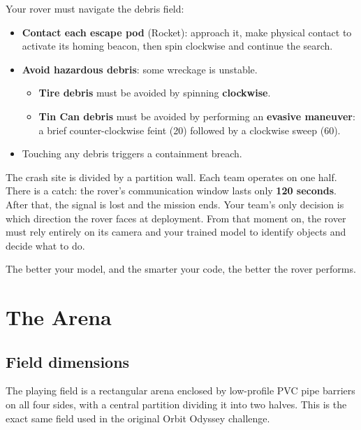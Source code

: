 \documentclass[a4]{article}
\begin{document}
Your rover must navigate the debris field:
\begin{itemize}
    \item \textbf{Contact each escape pod} (Rocket): approach it, make physical contact to activate its homing beacon, then spin clockwise and continue the search.
    \item \textbf{Avoid hazardous debris}: some wreckage is unstable.
    \begin{itemize}
        \item \textbf{Tire debris} must be avoided by spinning \textbf{clockwise}.
        \item \textbf{Tin Can debris} must be avoided by performing an \textbf{evasive maneuver}: a brief counter-clockwise feint (20\textdegree) followed by a clockwise sweep (60\textdegree).
    \end{itemize}
    \item Touching any debris triggers a containment breach.
\end{itemize}

The crash site is divided by a partition wall. Each team operates on one half. There is a catch: the rover's communication window lasts only \textbf{120 seconds}. After that, the signal is lost and the mission ends. Your team's only decision is which direction the rover faces at deployment. From that moment on, the rover must rely entirely on its camera and your trained model to identify objects and decide what to do.

The better your model, and the smarter your code, the better the rover performs.

\pagebreak
\section{The Arena}
\subsection*{Field dimensions}

The playing field is a rectangular arena enclosed by low-profile PVC pipe barriers on all four sides, with a central partition dividing it into two halves. This is the exact same field used in the original Orbit Odyssey challenge. 
\end{document}
